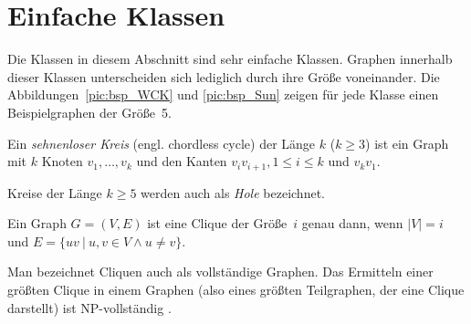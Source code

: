\section{Einfache Klassen}
Die Klassen in diesem Abschnitt sind sehr einfache Klassen. Graphen innerhalb dieser Klassen unterscheiden sich lediglich durch ihre Größe voneinander. Die Abbildungen~\ref{pic:bsp_WCK} und \ref{pic:bsp_Sun} zeigen für jede Klasse einen Beispielgraphen der Größe~5.

\begin{mydef}
    Ein \emph{sehnenloser Kreis} (engl. chordless cycle) der Länge $k$ ($k\geq 3$) ist ein Graph mit $k$ Knoten $v_1, \ldots, v_k$ und den Kanten $v_iv_{i+1}, 1 \leq i \leq k$ und $v_kv_1$.

    Kreise der Länge $k\geq 5$ werden auch als \emph{Hole} bezeichnet.
\end{mydef}


\begin{mydef}
    Ein Graph $G=(V,E)$ ist eine Clique der Größe~$i$ genau dann, wenn $|V|=i$ und $E=\{uv \ |\ u,v \in V \wedge u \neq v\}$.
\end{mydef}

Man bezeichnet Cliquen auch als vollständige Graphen. Das Ermitteln einer größten Clique in einem Graphen (also eines größten Teilgraphen, der eine Clique darstellt) ist NP-vollständig \cite{Karp72}.

